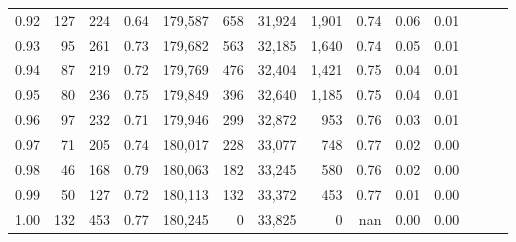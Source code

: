 \begin{tabular}{rrrrrrrrrrrrrr}
0.92 &    127 &  224 &  0.64 &  179,587 &      658 &  31,924 &   1,901 &  0.74 &  0.06 &      0.01 \\
0.93 &     95 &  261 &  0.73 &  179,682 &      563 &  32,185 &   1,640 &  0.74 &  0.05 &      0.01 \\
0.94 &     87 &  219 &  0.72 &  179,769 &      476 &  32,404 &   1,421 &  0.75 &  0.04 &      0.01 \\
0.95 &     80 &  236 &  0.75 &  179,849 &      396 &  32,640 &   1,185 &  0.75 &  0.04 &      0.01 \\
0.96 &     97 &  232 &  0.71 &  179,946 &      299 &  32,872 &     953 &  0.76 &  0.03 &      0.01 \\
0.97 &     71 &  205 &  0.74 &  180,017 &      228 &  33,077 &     748 &  0.77 &  0.02 &      0.00 \\
0.98 &     46 &  168 &  0.79 &  180,063 &      182 &  33,245 &     580 &  0.76 &  0.02 &      0.00 \\
0.99 &     50 &  127 &  0.72 &  180,113 &      132 &  33,372 &     453 &  0.77 &  0.01 &      0.00 \\
1.00 &    132 &  453 &  0.77 &  180,245 &        0 &  33,825 &       0 &   nan &  0.00 &      0.00 \\
\bottomrule
\end{tabular}
